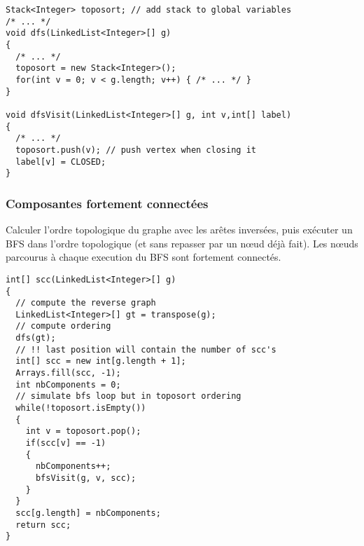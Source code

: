\begin{lstlisting}
Stack<Integer> toposort; // add stack to global variables
/* ... */
void dfs(LinkedList<Integer>[] g)
{
  /* ... */
  toposort = new Stack<Integer>();
  for(int v = 0; v < g.length; v++) { /* ... */ }
}

void dfsVisit(LinkedList<Integer>[] g, int v,int[] label)
{
  /* ... */
  toposort.push(v); // push vertex when closing it
  label[v] = CLOSED;
}
\end{lstlisting}
\subsubsection{Composantes fortement connectées}
Calculer l'ordre topologique du graphe avec les arêtes inversées, puis exécuter un BFS dans l'ordre topologique (et sans repasser par un nœud déjà fait). Les nœuds parcourus à chaque execution du BFS sont fortement connectés.
\begin{lstlisting}
int[] scc(LinkedList<Integer>[] g)
{
  // compute the reverse graph
  LinkedList<Integer>[] gt = transpose(g);
  // compute ordering
  dfs(gt);
  // !! last position will contain the number of scc's
  int[] scc = new int[g.length + 1];
  Arrays.fill(scc, -1);
  int nbComponents = 0;
  // simulate bfs loop but in toposort ordering
  while(!toposort.isEmpty())
  {
    int v = toposort.pop();
    if(scc[v] == -1)
    {
      nbComponents++;
      bfsVisit(g, v, scc);
    }
  }
  scc[g.length] = nbComponents;
  return scc;
}
\end{lstlisting}